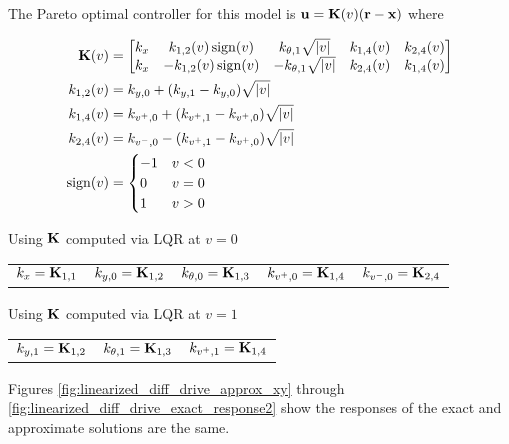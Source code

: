 \begin{theorem}
  The Pareto optimal controller for this model is
  $\mathbf{u} = \mathbf{K}(v) (\mathbf{r} - \mathbf{x})$ where

  \begin{align}
    \mathbf{K}(v) &= \begin{bmatrix}
      k_x & k_{1, 2}(v) \operatorname{sign}(v) & k_{\theta, 1} \sqrt{|v|} & k_{1, 4}(v) &
        k_{2, 4}(v) \\
      k_x & -k_{1, 2}(v) \operatorname{sign}(v) & -k_{\theta, 1} \sqrt{|v|} & k_{2, 4}(v) &
        k_{1, 4}(v)
    \end{bmatrix} \\
    k_{1, 2}(v) &= k_{y, 0} + (k_{y, 1} - k_{y, 0}) \sqrt{|v|} \\
    k_{1, 4}(v) &= k_{v^+, 0} + (k_{v^+, 1} - k_{v^+, 0}) \sqrt{|v|} \\
    k_{2, 4}(v) &= k_{v^-, 0} - (k_{v^+, 1} - k_{v^+, 0}) \sqrt{|v|} \\
    \operatorname{sign}(v) &= \begin{cases}
      -1 & v < 0 \\
      0 & v = 0 \\
      1 & v > 0
    \end{cases}
  \end{align}

  Using $\mathbf{K}$ computed via LQR at $v = 0$
  \begin{figurekey}
    \begin{tabular}{lllll}
      $k_x = \mathbf{K}_{1, 1}$ &
        $k_{y, 0} = \mathbf{K}_{1, 2}$ &
        $k_{\theta, 0} = \mathbf{K}_{1, 3}$ &
        $k_{v^+, 0} = \mathbf{K}_{1, 4}$ &
        $k_{v^-, 0} = \mathbf{K}_{2, 4}$
    \end{tabular}
  \end{figurekey}

  Using $\mathbf{K}$ computed via LQR at $v = 1$
  \begin{figurekey}
    \begin{tabular}{lll}
        $k_{y, 1} = \mathbf{K}_{1, 2}$ &
        $k_{\theta, 1} = \mathbf{K}_{1, 3}$ &
        $k_{v^+, 1} = \mathbf{K}_{1, 4}$
    \end{tabular}
  \end{figurekey}
\end{theorem}

Figures \ref{fig:linearized_diff_drive_approx_xy} through
\ref{fig:linearized_diff_drive_exact_response2} show the responses of the exact
and approximate solutions are the same.

